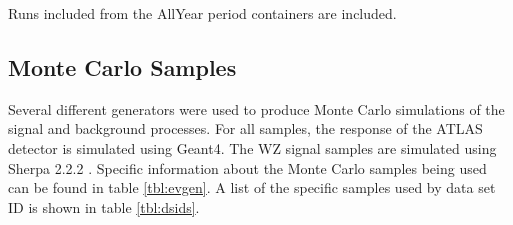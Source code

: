 Runs included from the AllYear period containers are included.

\subsection{Monte Carlo Samples}

Several different generators were used to produce Monte Carlo simulations of the signal and background processes. For all samples, the response of the ATLAS detector is simulated using Geant4. The WZ signal samples are simulated using Sherpa 2.2.2 \cite{sherpa}. Specific information about the Monte Carlo samples being used can be found in table \ref{tbl:evgen}. A list of the specific samples used by data set ID is shown in table \ref{tbl:dsids}.

\begin{table}[hbt!]
\begin{center}
\caption{\label{tbl:evgen} The configurations used for event generation of signal and background processes, including the event generator, matrix element (ME) order, parton shower algorithm, and parton distribution functin (PDF). }
\end{center}
\end{table}
